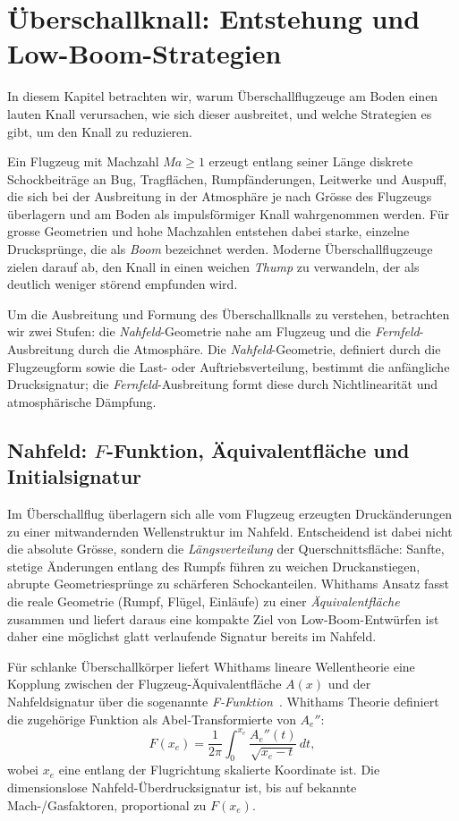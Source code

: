 \section{Überschallknall: Entstehung und Low-Boom-Strategien}
\label{schall:section:boom}

In diesem Kapitel betrachten wir, warum Überschallflugzeuge am Boden
einen lauten Knall verursachen, wie sich dieser ausbreitet, und welche
Strategien es gibt, um den Knall zu reduzieren.

Ein Flugzeug mit Machzahl $\textit{Ma}\ge1$ erzeugt entlang seiner Länge diskrete
Schockbeiträge an Bug, Tragflächen, Rumpfänderungen, Leitwerke und Auspuff,
die sich bei der Ausbreitung in der Atmosphäre je nach Grösse des Flugzeugs
überlagern und am Boden als impulsförmiger Knall wahrgenommen werden.
Für grosse Geometrien und hohe Machzahlen entstehen dabei
starke, einzelne Drucksprünge, die als \emph{Boom} bezeichnet werden.
Moderne Überschallflugzeuge zielen darauf ab, den Knall in einen
weichen \emph{Thump} zu verwandeln, der als deutlich weniger störend
empfunden wird.

Um die Ausbreitung und Formung des Überschallknalls zu verstehen, betrachten wir
zwei Stufen: die \emph{Nahfeld}-Geometrie nahe am Flugzeug und die \emph{Fernfeld}-Ausbreitung
durch die Atmosphäre.
Die \emph{Nahfeld}-Geometrie, definiert durch die Flugzeugform sowie die  Last- oder
Auftriebsverteilung, bestimmt die anfängliche Drucksignatur;
die \emph{Fernfeld}-Ausbreitung formt diese durch Nichtlinearität und atmosphärische Dämpfung.

\subsection{Nahfeld: $F$-Funktion, Äquivalentfläche und Initialsignatur}
Im Überschallflug überlagern sich alle vom Flugzeug erzeugten
Druckänderungen zu einer mitwandernden Wellenstruktur im Nahfeld.
Entscheidend ist dabei nicht die absolute Grösse, sondern die
\emph{Längsverteilung} der Querschnittsfläche:
Sanfte, stetige Änderungen entlang des Rumpfs führen zu weichen
Druckanstiegen, abrupte Geometriesprünge zu schärferen Schockanteilen.
Whithams Ansatz fasst die reale Geometrie (Rumpf, Flügel, Einläufe) zu
einer \emph{Äquivalentfläche} zusammen und liefert daraus eine kompakte
Ziel von Low-Boom-Entwürfen ist daher eine möglichst glatt
verlaufende Signatur bereits im Nahfeld.

Für schlanke Überschallkörper liefert Whithams lineare Wellentheorie eine
Kopplung zwischen der Flugzeug-Äquivalentfläche $A(x)$ und der
Nahfeldsignatur über die sogenannte \emph{F-Funktion}~\cite{schall:whitham}.
Whithams Theorie definiert die zugehörige Funktion
als Abel-Transformierte von $A_e''$:
\begin{equation}
    F(x_e)=\frac{1}{2\pi}\int_{0}^{x_e}\frac{A_e''(t)}{\sqrt{x_e-t}}\,dt,
\end{equation}
wobei $x_e$ eine entlang der Flugrichtung skalierte Koordinate ist.
Die dimensionslose Nahfeld-Überdrucksignatur ist, bis auf bekannte
Mach-/Gasfaktoren, proportional zu $F(x_e)$.

